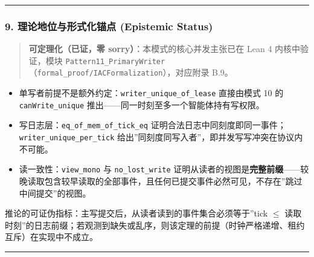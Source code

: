 \begin{Shaded}
\begin{Highlighting}[]
    \NormalTok{ \{}
\OperatorTok{:} \OperatorTok{,}
\OperatorTok{:} \OperatorTok{,}
\OperatorTok{:} 
\NormalTok{    \}}\OperatorTok{;}
\NormalTok{  \}}
\NormalTok{\}}
\end{Highlighting}
\end{Shaded}

\begin{center}\rule{0.5\linewidth}{0.5pt}\end{center}

\subsubsection{9. 理论地位与形式化锚点 (Epistemic
Status)}\label{ux7406ux8bbaux5730ux4f4dux4e0eux5f62ux5f0fux5316ux951aux70b9-epistemic-status}

\begin{quote}
\textbf{可定理化（已证，零 sorry）}：本模式的核心并发主张已在 Lean 4
内核中验证，模块
\texttt{Pattern11\_PrimaryWriter}（\texttt{formal\_proof/IACFormalization}），对应附录
B.9。
\end{quote}

\begin{itemize}
\tightlist
\item
  单写者前提不是额外约定：\texttt{writer\_unique\_of\_lease} 直接由模式
  10 的 \texttt{canWrite\_unique}
  推出------同一时刻至多一个智能体持有写权限。
\item
  写日志层：\texttt{eq\_of\_mem\_of\_tick\_eq}
  证明合法日志中同刻度即同一事件；\texttt{writer\_unique\_per\_tick}
  给出''同刻度同写入者''，即并发写写冲突在协议内不可能。
\item
  读一致性：\texttt{view\_mono} 与 \texttt{no\_lost\_write}
  证明从读者的视图是\textbf{完整前缀}------较晚读取包含较早读取的全部事件，且任何已提交事件必然可见，不存在''跳过中间提交''的视图。
\end{itemize}

推论的可证伪指标：主写提交后，从读者读到的事件集合必须等于''tick \(\le\)
读取时刻''的日志前缀；若观测到缺失或乱序，则该定理的前提（时钟严格递增、租约互斥）在实现中不成立。

\begin{center}\rule{0.5\linewidth}{0.5pt}\end{center}

